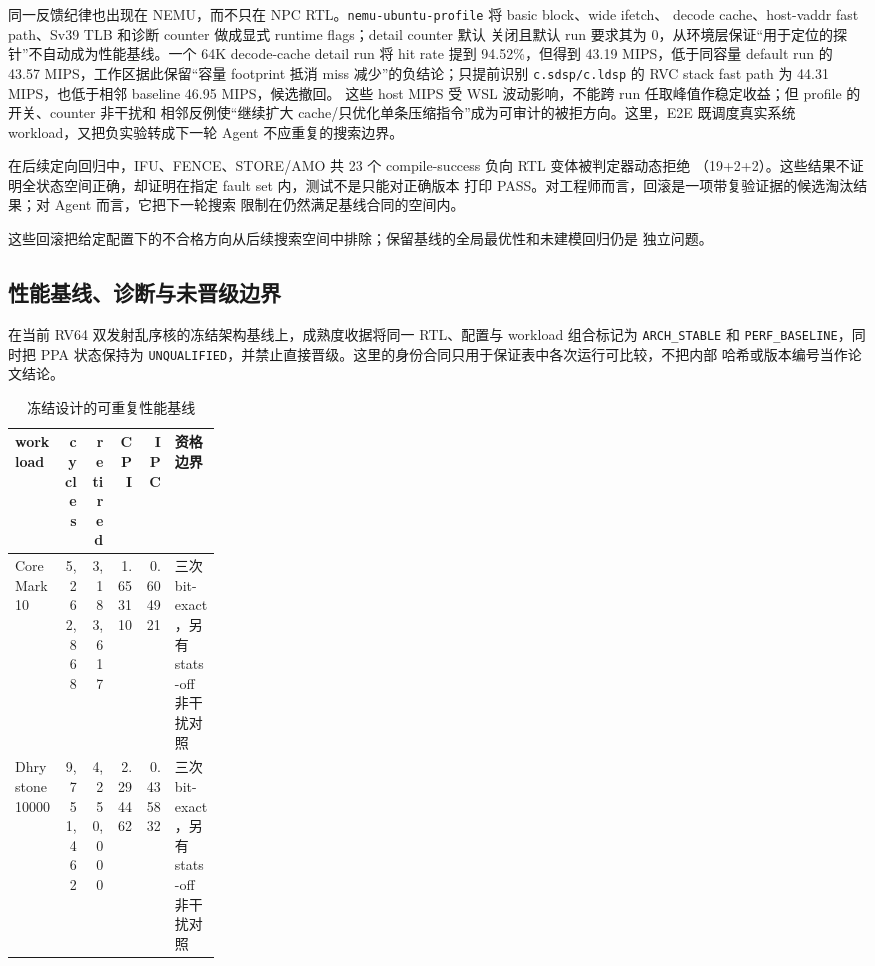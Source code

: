 \documentclass[UTF8,a4paper,zihao=-4,oneside]{ctexart}
\newcommand{\statusword}[1]{\texttt{#1}}
\begin{document}
同一反馈纪律也出现在 NEMU，而不只在 NPC RTL。\texttt{nemu-ubuntu-profile} 将 basic block、wide ifetch、
decode cache、host-vaddr fast path、Sv39 TLB 和诊断 counter 做成显式 runtime flags；detail counter 默认
关闭且默认 run 要求其为 0，从环境层保证“用于定位的探针”不自动成为性能基线。一个 64K
decode-cache detail run 将 hit rate 提到 94.52\%，但得到 43.19 MIPS，低于同容量 default run 的
43.57 MIPS，工作区据此保留“容量 footprint 抵消 miss 减少”的负结论；只提前识别
\texttt{c.sdsp/c.ldsp} 的 RVC stack fast path 为 44.31 MIPS，也低于相邻 baseline 46.95 MIPS，候选撤回。
这些 host MIPS 受 WSL 波动影响，不能跨 run 任取峰值作稳定收益；但 profile 的开关、counter 非干扰和
相邻反例使“继续扩大 cache/只优化单条压缩指令”成为可审计的被拒方向。这里，E2E 既调度真实系统
workload，又把负实验转成下一轮 Agent 不应重复的搜索边界。

在后续定向回归中，IFU、FENCE、STORE/AMO 共 23 个 compile-success 负向 RTL 变体被判定器动态拒绝
（19+2+2）。这些结果不证明全状态空间正确，却证明在指定 fault set 内，测试不是只能对正确版本
打印 PASS。对工程师而言，回滚是一项带复验证据的候选淘汰结果；对 Agent 而言，它把下一轮搜索
限制在仍然满足基线合同的空间内。

这些回滚把给定配置下的不合格方向从后续搜索空间中排除；保留基线的全局最优性和未建模回归仍是
独立问题。

\subsection{性能基线、诊断与未晋级边界}

在当前 RV64 双发射乱序核的冻结架构基线上，成熟度收据将同一 RTL、配置与 workload 组合标记为
\statusword{ARCH\_STABLE} 和 \statusword{PERF\_BASELINE}，同时把 PPA 状态保持为
\statusword{UNQUALIFIED}，并禁止直接晋级。这里的身份合同只用于保证表中各次运行可比较，不把内部
哈希或版本编号当作论文结论。

\begin{table}[htbp]
  \centering
  \small
  \caption{冻结设计的可重复性能基线}
  \label{tab:perf-baseline}
  \begin{tabularx}{\linewidth}{@{}L{0.24\linewidth}rrrrY@{}}
    \toprule
    workload & cycles & retired & CPI & IPC & 资格边界 \\
    \midrule
    CoreMark10 & 5,262,868 & 3,183,617 & 1.653110 & 0.604921 & 三次 bit-exact，另有 stats-off 非干扰对照 \\
    Dhrystone10000 & 9,751,462 & 4,250,000 & 2.294462 & 0.435832 & 三次 bit-exact，另有 stats-off 非干扰对照 \\
    \bottomrule
  \end{tabularx}
\end{table}
\end{document}
